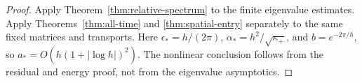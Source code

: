 \begin{proof}
Apply Theorem~\ref{thm:relative-spectrum} to the finite
eigenvalue estimates. Apply Theorems~\ref{thm:all-time}
and \ref{thm:spatial-entry} separately to the same
fixed matrices and transports. Here
$\epsilon_*=h/(2\pi)$, $\alpha_*=h^2/\sqrt{\kappa_+}$,
and $b=e^{-2\pi/h}$, so
$a_*=O(h(1+|\log h|)^2)$. The nonlinear conclusion
follows from the residual and energy proof, not from
the eigenvalue asymptotics.
\end{proof}
